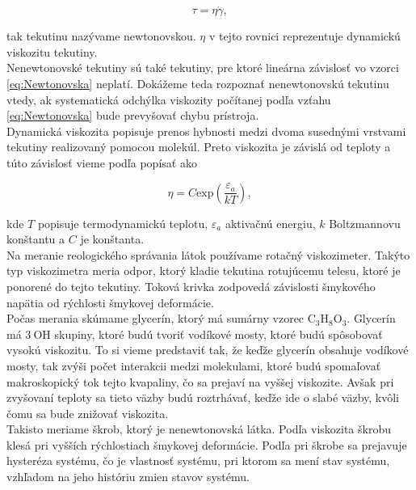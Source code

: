 \documentclass{prepareprotokol} %
\begin{document}
\begin{equation}
		\tau = \eta\dot{\gamma},
		\label{eq:Newtonovska}
\end{equation} 

tak tekutinu nazývame newtonovskou. 
$\eta$ v tejto rovnici reprezentuje dynamickú viskozitu tekutiny.\\

Nenewtonovské tekutiny sú také tekutiny, pre ktoré lineárna závislosť vo vzorci \ref{eq:Newtonovska} neplatí. 
Dokážeme teda rozpoznať nenewtonovskú tekutinu vtedy, ak systematická odchýlka viskozity počítanej podľa vzťahu \ref{eq:Newtonovska} bude prevyšovať chybu prístroja.\\

Dynamická viskozita popisuje prenos hybnosti medzi dvoma susednými vrstvami tekutiny realizovaný pomocou molekúl. 
Preto viskozita je závislá od teploty a túto závislosť vieme podľa \cite{Študijný text} popísať ako

\begin{equation}
		  \eta = C\mathrm{exp}(\frac{\varepsilon_a}{kT}),
		\label{eq:TeplotnaZavislost}
\end{equation} 

kde $T$ popisuje termodynamickú teplotu, $\varepsilon_a$ aktivačnú energiu, $k$ Boltzmannovu konštantu a $C$ je konštanta.\\

Na meranie reologického správania látok používame rotačný viskozimeter. 
Takýto typ viskozimetra meria odpor, ktorý kladie tekutina rotujúcemu telesu, ktoré je ponorené do tejto tekutiny. 
Toková krivka zodpovedá závislosti šmykového napätia od rýchlosti šmykovej deformácie.\\


Počas merania skúmame glycerín, ktorý má sumárny vzorec $\mathrm{C}_3\mathrm{H}_8\mathrm{O}_3$. Glycerín má $3~\mathrm{OH}$ skupiny, ktoré budú tvoriť vodíkové mosty, ktoré budú spôsobovať vysokú viskozitu. 
To si vieme predstaviť tak, že keďže glycerín obsahuje vodíkové mosty, tak zvýši počet interakcii medzi molekulami, ktoré budú spomaľovať makroskopický tok tejto kvapaliny, čo sa prejaví na vyššej viskozite. 
Avšak pri zvyšovaní teploty sa tieto väzby budú roztrhávať, keďže ide o slabé väzby, kvôli čomu sa bude znižovať viskozita. \\

Takisto meriame škrob, ktorý je nenewtonovská látka.
Podľa \cite{Skrob} viskozita škrobu klesá pri vyšších rýchlostiach šmykovej deformácie. 
Podľa \cite{Hysteréza} pri škrobe sa prejavuje hysteréza systému, čo je vlastnosť systému, pri ktorom sa mení stav systému, vzhľadom na jeho históriu zmien stavov systému.\\
\end{document}
